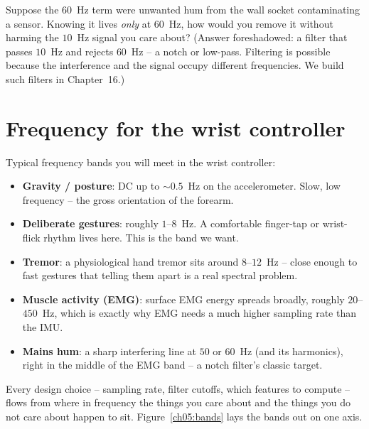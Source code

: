\begin{walkbox}
Suppose the $60$~Hz term were unwanted hum from the wall socket contaminating a
sensor. Knowing it lives \emph{only} at $60$~Hz, how would you remove it without
harming the $10$~Hz signal you care about? (Answer foreshadowed: a filter that passes
$10$~Hz and rejects $60$~Hz -- a notch or low-pass. Filtering is
possible because the interference and the signal occupy different frequencies. We
build such filters in Chapter~16.)
\end{walkbox}

\section{Frequency for the wrist controller}

\begin{goalbox}
Typical frequency bands you will meet in the wrist controller:
\begin{itemize}
  \item \textbf{Gravity / posture}: DC up to $\sim 0.5$~Hz on the
        accelerometer. Slow, low frequency -- the gross orientation of the forearm.
  \item \textbf{Deliberate gestures}: roughly $1$--$8$~Hz. A comfortable finger-tap
        or wrist-flick rhythm lives here. This is the band we want.
  \item \textbf{Tremor}: a physiological hand tremor sits around $8$--$12$~Hz -- close
        enough to fast gestures that telling them apart is a real spectral problem.
  \item \textbf{Muscle activity (EMG)}: surface EMG energy spreads broadly, roughly
        $20$--$450$~Hz, which is exactly why EMG needs a much higher sampling rate
        than the IMU.
  \item \textbf{Mains hum}: a sharp interfering line at $50$ or $60$~Hz (and its
        harmonics), right in the middle of the EMG band -- a notch filter's classic
        target.
\end{itemize}
Every design choice -- sampling rate, filter cutoffs, which features to compute --
flows from where in frequency the things you care about and the things you do not
care about happen to sit. Figure~\ref{ch05:bands} lays the bands out on one axis.
\end{goalbox}

